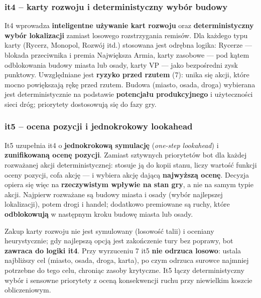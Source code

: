 \subsubsection{it4 -- karty rozwoju i deterministyczny wybór budowy}

It4 wprowadza \textbf{inteligentne używanie kart rozwoju} oraz \textbf{deterministyczny wybór lokalizacji} zamiast losowego rozstrzygania remisów. Dla każdego typu karty (Rycerz, Monopol, Rozwój itd.) stosowana jest odrębna logika: Rycerze --- blokada przeciwnika i premia Największa Armia, karty zasobowe --- pod kątem odblokowania budowy miasta lub osady, karty VP --- jako bezpośredni zysk punktowy. Uwzględniane jest \textbf{ryzyko przed rzutem} (7): unika się akcji, które mocno powiększają rękę przed rzutem. Budowa (miasto, osada, droga) wybierana jest deterministycznie na podstawie \textbf{potencjału produkcyjnego} i użyteczności sieci dróg; priorytety dostosowują się do fazy gry.

\subsubsection{it5 -- ocena pozycji i jednokrokowy lookahead}

It5 uzupełnia it4 o \textbf{jednokrokową symulację} (\emph{one-step lookahead}) i \textbf{zunifikowaną ocenę pozycji}. Zamiast sztywnych priorytetów bot dla każdej rozważanej akcji deterministycznej: stosuje ją do kopii stanu, liczy wartość funkcji oceny pozycji, cofa akcję --- i wybiera akcję dającą \textbf{najwyższą ocenę}. Decyzja opiera się więc na \textbf{rzeczywistym wpływie na stan gry}, a nie na samym typie akcji. Najpierw rozważane są budowy miasta i osady (wybór najlepszej lokalizacji), potem drogi i handel; dodatkowo premiowane są ruchy, które \textbf{odblokowują} w następnym kroku budowę miasta lub osady.

Zakup karty rozwoju nie jest symulowany (losowość talii) i oceniany heurystycznie; gdy najlepszą opcją jest zakończenie tury bez poprawy, bot \textbf{zawraca do logiki it4}. Przy wyrzuceniu 7 it5 \textbf{nie odrzuca losowo}: ustala najbliższy cel (miasto, osada, droga, karta), po czym odrzuca surowce najmniej potrzebne do tego celu, chroniąc zasoby krytyczne. It5 łączy deterministyczny wybór i sensowne priorytety z oceną konsekwencji ruchu przy niewielkim koszcie obliczeniowym.
